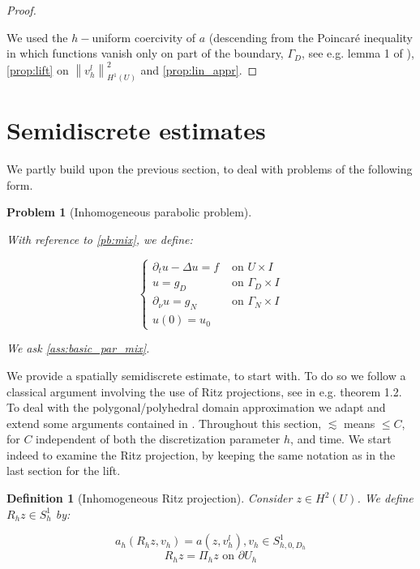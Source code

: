\documentclass[english,a4paper,9pt,oneside]{scrbook}	%
\theoremstyle{break}
\newtheorem{defn}[equation]{Definition}
\newtheorem{pb}[equation]{Problem}
\newenvironment{mproof}[1][\proofname]{%
  \begin{proof}[#1]$ $\par\nobreak\ignorespaces
}{%
  \end{proof}
}
\renewcommand*{\proofname}{Proof}
\theoremstyle{remark}
\newcommand{\norm}[1]{\left\lVert#1\right\rVert}
\begin{document}
\begin{appendices}
\begin{mproof}
We used the $h-$uniform coercivity of $a$ (descending from the Poincaré inequality in which functions vanish only on part of the boundary, $\Gamma_D$, see e.g. lemma 1 of \cite{dorfler}), \cref{prop:lift} on $\norm{v_h^l}_{H^1(U)}^2$ and \cref{prop:lin_appr}.
\end{mproof}

\section{Semidiscrete estimates}
\label{sec:semid}
We partly build upon the previous section, to deal with problems of the following form.

\begin{pb}[Inhomogeneous parabolic problem]
\label{pb:inh_parabolic}

With reference to \cref{pb:mix}, we define:

$$
\left\{\begin{matrix}
\partial_t u-\Delta u = f & \text{ on } U \times I \\ 
u = g_D & \text{ on } \Gamma_D \times I\\ 
\partial_\nu u = g_N & \text{ on } \Gamma_N \times I \\
u(0) =  u_0
\end{matrix}\right.
$$

We ask \cref{ass:basic_par_mix}.

\end{pb}

We provide a spatially semidiscrete estimate, to start with. To do so we follow a classical argument involving the use of Ritz projections, see \cite{thomee} in e.g. theorem 1.2. To deal with the polygonal/polyhedral domain approximation we adapt and extend some arguments contained in \cite{ranner}.
Throughout this section, $\lesssim$ means $\leq C $, for $C$ independent of both the discretization parameter $h$, and time.
We start indeed to examine the Ritz projection, by keeping the same notation as in the last section for the lift.


\begin{defn}[Inhomogeneous Ritz projection]
Consider $z \in H^2(U)$. We define $R_h z \in S^1_h$ by:

$$a_h(R_h z , v_h) = a(z, v_h^l), v_h \in S^1_{h,0,D_h}$$
$$R_h z = \Pi_h z \text{ on } \partial U_h$$


\end{defn}
\end{appendices}
\end{document}

